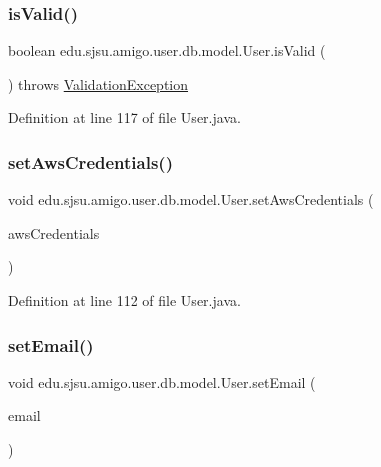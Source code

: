 \subsubsection{\texorpdfstring{is\+Valid()}{isValid()}}
{\footnotesize\ttfamily boolean edu.\+sjsu.\+amigo.\+user.\+db.\+model.\+User.\+is\+Valid (\begin{DoxyParamCaption}{ }\end{DoxyParamCaption}) throws \hyperlink{classedu_1_1sjsu_1_1amigo_1_1db_1_1common_1_1model_1_1_validation_exception}{Validation\+Exception}}



Definition at line 117 of file User.\+java.

\mbox{\label{classedu_1_1sjsu_1_1amigo_1_1user_1_1db_1_1model_1_1_user_a7dfe7c2b51f1ae7ea8b5749ee39acbc7}} 
\subsubsection{\texorpdfstring{set\+Aws\+Credentials()}{setAwsCredentials()}}
{\footnotesize\ttfamily void edu.\+sjsu.\+amigo.\+user.\+db.\+model.\+User.\+set\+Aws\+Credentials (\begin{DoxyParamCaption}\item[{\hyperlink{classedu_1_1sjsu_1_1amigo_1_1user_1_1db_1_1model_1_1_a_w_s_credentials}{A\+W\+S\+Credentials}}]{aws\+Credentials }\end{DoxyParamCaption})}



Definition at line 112 of file User.\+java.

\mbox{\label{classedu_1_1sjsu_1_1amigo_1_1user_1_1db_1_1model_1_1_user_aff73e972167c6af4dddae59904cad95c}} 
\subsubsection{\texorpdfstring{set\+Email()}{setEmail()}}
{\footnotesize\ttfamily void edu.\+sjsu.\+amigo.\+user.\+db.\+model.\+User.\+set\+Email (\begin{DoxyParamCaption}\item[{String}]{email }\end{DoxyParamCaption})}



